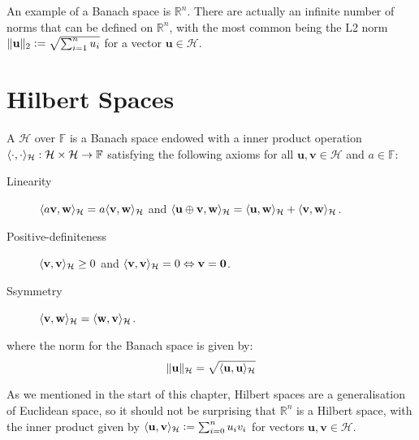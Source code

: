 An example of a Banach space is $\mathbb{R}^n$. There are actually an infinite number of norms that can be defined on $\mathbb{R}^n$, with the most common being the L2 norm $\lVert\mathbf{u}\rVert_2 \vcentcolon= \sqrt{\sum_{i=1}^n u_i}$ for a vector $\mathbf{u} \in \mathcal{H}$. 

\section{Hilbert Spaces}

\begin{definition}
A  $\mathcal{H}$ over $\mathbb{F}$ is a Banach space endowed with a inner product operation $\langle\cdot, \cdot\rangle_\mathcal{H} : \mathcal{H} \times \mathcal{H} \to \mathbb{F}$ satisfying the following axioms for all $\mathbf{u}, \mathbf{v} \in \mathcal{H}$ and $a \in \mathbb{F}$:
%
\begin{description}
  \item[Linearity] $\langle a \mathbf{v}, \mathbf{w}\rangle_\mathcal{H} = a \langle\mathbf{v}, \mathbf{w}\rangle_\mathcal{H}$ and $\langle\mathbf{u} \oplus \mathbf{v}, \mathbf{w}\rangle_\mathcal{H} = \langle\mathbf{u}, \mathbf{w}\rangle_\mathcal{H} + \langle\mathbf{v}, \mathbf{w}\rangle_\mathcal{H}$.
  \item[Positive-definiteness] $\langle\mathbf{v}, \mathbf{v}\rangle_\mathcal{H} \geq 0$ and $\langle\mathbf{v}, \mathbf{v}\rangle_\mathcal{H} = 0 \Leftrightarrow \mathbf{v} = \mathbf{0}$.
  \item[Ssymmetry] $\langle\mathbf{v}, \mathbf{w}\rangle_\mathcal{H} = \langle\mathbf{w}, \mathbf{v}\rangle_\mathcal{H}$.
\end{description}
%
where the norm for the Banach space is given by:
%
\begin{equation}
  \lVert\mathbf{u}\rVert_\mathcal{H} = \sqrt{\langle\mathbf{u}, \mathbf{u}\rangle_\mathcal{H}}
\end{equation}
%
\end{definition}

As we mentioned in the start of this chapter, Hilbert spaces are a generalisation of Euclidean space, so it should not be surprising that $\mathbb{R}^n$ is a Hilbert space, with the inner product given by $\langle\mathbf{u}, \mathbf{v}\rangle_\mathcal{H} \vcentcolon= \sum_{i=0}^n u_i v_i$ for vectors $\mathbf{u}, \mathbf{v} \in \mathcal{H}$.

